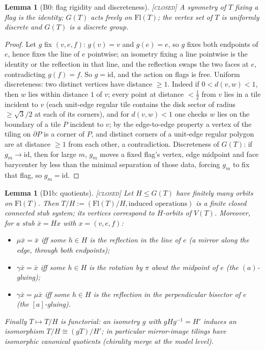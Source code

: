 \documentclass[11pt]{article}
\newtheorem{lemma}[theorem]{Lemma}
\theoremstyle{definition}
\newcommand{\CLOSED}{\textnormal{\textsc{[closed]}}}
\newcommand{\Flags}{\mathrm{Fl}}
\begin{document}
\begin{lemma}[B0: flag rigidity and discreteness]\label{lem:B0} \CLOSED\;
A symmetry of $T$ fixing a flag is the identity; $G(T)$ acts freely on $\Flags(T)$; the
vertex set of $T$ is uniformly discrete and $G(T)$ is a discrete group.
\end{lemma}

\begin{proof}
Let $g$ fix $(v,e,f)$: $g(v) = v$ and $g(e) = e$, so $g$ fixes both endpoints of $e$,
hence fixes the line of $e$ pointwise; an isometry fixing a line pointwise is the
identity or the reflection in that line, and the reflection swaps the two faces at $e$,
contradicting $g(f) = f$. So $g = \mathrm{id}$, and the action on flags is free.
Uniform discreteness: two distinct vertices have distance $\ge 1$. Indeed if
$0 < d(v,w) < 1$, then $w$ lies within distance $1$ of $v$; every point at distance
$< \tfrac12$ from $v$ lies in a tile incident to $v$ (each unit-edge regular tile
contains the disk sector of radius $\ge \sqrt3/2$ at each of its corners), and for
$d(v,w) < 1$ one checks $w$ lies on the boundary of a tile $P$ incident to $v$; by the
edge-to-edge property a vertex of the tiling on $\partial P$ is a corner of $P$, and
distinct corners of a unit-edge regular polygon are at distance $\ge 1$ from each other,
a contradiction. Discreteness of $G(T)$: if $g_m \to \mathrm{id}$, then for large $m$,
$g_m$ moves a fixed flag's vertex, edge midpoint and face barycenter by less than the
minimal separation of those data, forcing $g_m$ to fix that flag, so $g_m =
\mathrm{id}$.
\end{proof}

\begin{lemma}[D1b: quotients]\label{lem:D1b} \CLOSED\;
Let $H \le G(T)$ have finitely many orbits on $\Flags(T)$. Then
$T/H := (\Flags(T)/H, \text{induced operations})$ is a finite closed connected stub
system; its vertices correspond to $H$-orbits of $V(T)$. Moreover, for a stub
$\bar{x} = Hx$ with $x = (v,e,f)$:
\begin{itemize}
\item[(i)] $\mu\bar x = \bar x$ iff some $h \in H$ is the reflection in the line of $e$
  (a mirror along the edge, through both endpoints);
\item[(ii)] $\gamma\bar x = \bar x$ iff some $h \in H$ is the rotation by $\pi$ about the
  midpoint of $e$ (the $(a)$-gluing);
\item[(iii)] $\gamma\bar x = \mu\bar x$ iff some $h \in H$ is the reflection in the
  perpendicular bisector of $e$ (the $[a]$-gluing).
\end{itemize}
Finally $T \mapsto T/H$ is functorial: an isometry $g$ with $gHg^{-1} = H'$ induces an
isomorphism $T/H \cong (gT)/H'$; in particular mirror-image tilings have isomorphic
canonical quotients (chirality merge at the model level).
\end{lemma}
\end{document}
